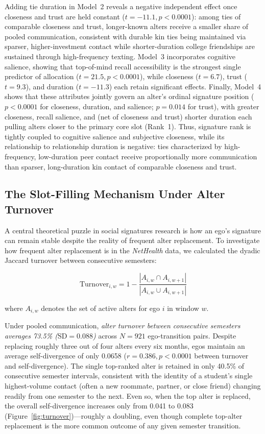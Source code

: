 \documentclass[11pt,letterpaper]{article}
\newcommand{\Turnover}{\mathrm{Turnover}}
\begin{document}
Adding tie duration in Model~2 reveals a negative independent effect once closeness and trust are held constant ($t = -11.1, p < 0.0001$): among ties of comparable closeness and trust, longer-known alters receive a smaller share of pooled communication, consistent with durable kin ties being maintained via sparser, higher-investment contact while shorter-duration college friendships are sustained through high-frequency texting. Model~3 incorporates cognitive salience, showing that top-of-mind recall accessibility is the strongest single predictor of allocation ($t = 21.5, p < 0.0001$), while closeness ($t = 6.7$), trust ($t = 9.3$), and duration ($t = -11.3$) each retain significant effects. Finally, Model~4 shows that these attributes jointly govern an alter's ordinal signature position ($p < 0.0001$ for closeness, duration, and salience; $p = 0.014$ for trust), with greater closeness, recall salience, and (net of closeness and trust) shorter duration each pulling alters closer to the primary core slot (Rank~1). Thus, signature rank is tightly coupled to cognitive salience and subjective closeness, while its relationship to relationship duration is negative: ties characterized by high-frequency, low-duration peer contact receive proportionally more communication than sparser, long-duration kin contact of comparable closeness and trust.

\subsection{The Slot-Filling Mechanism Under Alter Turnover}
A central theoretical puzzle in social signatures research is how an ego's signature can remain stable despite the reality of frequent alter replacement. To investigate how frequent alter replacement is in the \textit{NetHealth} data, we calculated the dyadic Jaccard turnover between consecutive semesters:

\begin{equation}
\Turnover_{i,w} = 1 - \frac{|A_{i,w} \cap A_{i,w+1}|}{|A_{i,w} \cup A_{i,w+1}|}
\end{equation}

where $A_{i,w}$ denotes the set of active alters for ego $i$ in window $w$.

Under pooled communication, \textit{alter turnover between consecutive semesters averages 73.5\% ($\text{SD} = 0.088$)} across $N = 921$ ego-transition pairs. Despite replacing roughly three out of four alters every six months, egos maintain an average self-divergence of only 0.0658 ($r = 0.386, p < 0.0001$ between turnover and self-divergence). The single top-ranked alter is retained in only 40.5\% of consecutive semester intervals, consistent with the identity of a student's single highest-volume contact (often a new roommate, partner, or close friend) changing readily from one semester to the next. Even so, when the top alter is replaced, the overall self-divergence increases only from 0.041 to 0.083 (Figure~\ref{fig:turnover})---roughly a doubling, even though complete top-alter replacement is the more common outcome of any given semester transition.
\end{document}
